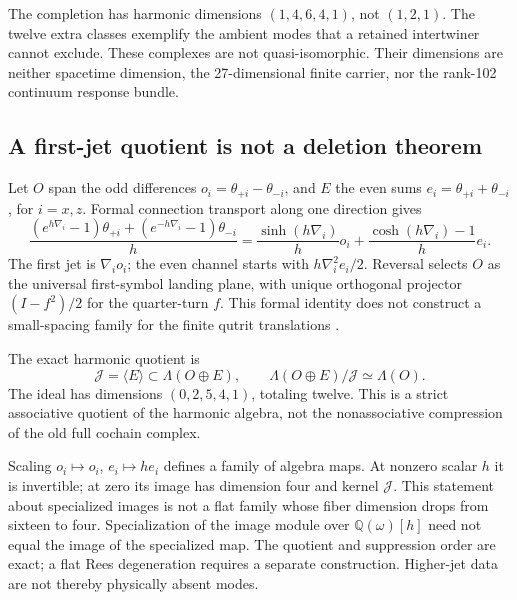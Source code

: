 \documentclass[11pt,a4paper]{article}
\begin{document}
The completion has harmonic dimensions \((1,4,6,4,1)\), not \((1,2,1)\).
The twelve extra classes exemplify the ambient modes that a retained
intertwiner cannot exclude. These complexes are not quasi-isomorphic.
Their dimensions are neither spacetime dimension, the 27-dimensional
finite carrier, nor the rank-102 continuum response bundle.

\subsection{A first-jet quotient is not a deletion theorem}
\label{sec:first-jet-quotient}
Let \(O\) span the odd differences \(o_i=\theta_{+i}-\theta_{-i}\),
and \(E\) the even sums \(e_i=\theta_{+i}+\theta_{-i}\), for \(i=x,z\).
Formal connection transport along one direction gives
\[
 \frac{(e^{h\nabla_i}-1)\theta_{+i}+(e^{-h\nabla_i}-1)\theta_{-i}}{h}
 =\frac{\sinh(h\nabla_i)}{h}o_i+
   \frac{\cosh(h\nabla_i)-1}{h}e_i.
\]
The first jet is \(\nabla_i o_i\); the even channel starts with
\(h\nabla_i^2e_i/2\). Reversal selects \(O\) as the universal
first-symbol landing plane, with unique orthogonal projector
\((I-f^2)/2\) for the quarter-turn \(f\). This formal identity does not
construct a small-spacing family for the finite qutrit translations
\cite{CBFSignedJet2026}.

The exact harmonic quotient is
\[
 \mathcal J=\langle E\rangle\subset\Lambda(O\oplus E),\qquad
 \Lambda(O\oplus E)/\mathcal J\simeq\Lambda(O).
\]
The ideal has dimensions \((0,2,5,4,1)\), totaling twelve. This is a
strict associative quotient of the harmonic algebra, not the
nonassociative compression of the old full cochain complex.

Scaling \(o_i\mapsto o_i\), \(e_i\mapsto h e_i\) defines a family of
algebra maps. At nonzero scalar \(h\) it is invertible; at zero its
image has dimension four and kernel \(\mathcal J\). This statement
about specialized images is not a flat family whose fiber dimension drops
from sixteen to four. Specialization of the image module over
\(\mathbb Q(\omega)[h]\) need not equal the image of the specialized
map. The quotient and suppression order are exact; a flat Rees
degeneration requires a separate construction. Higher-jet data are not
thereby physically absent modes.
\end{document}

